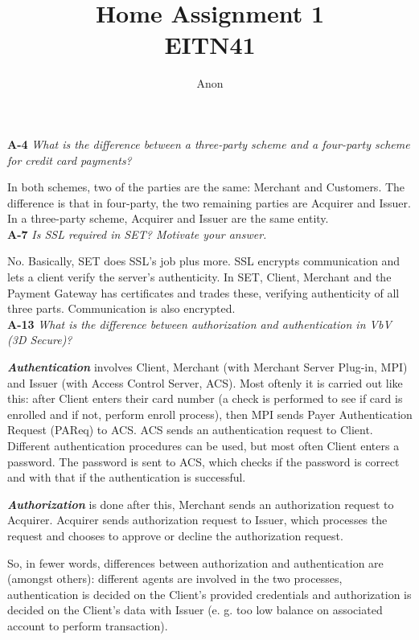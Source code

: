 \documentclass[a4paper]{article}
\title{Home Assignment 1 \\ EITN41}
\author{Anon}
\date{}
\newcommand{\Q}[2]{
  \textbf{#1} \textit{#2}
 }
\newcommand{\A}[1]{ #1 \\ }
\begin{document}
\maketitle

\Q{A-4} {What  is  the  difference  between  a  three-party  scheme  and  a  four-party  
scheme  for  credit  card  payments?}

\A{
  In both schemes, two of the parties are the same: Merchant and Customers.
  The difference is that in four-party, the two remaining parties are
  Acquirer and Issuer. In a three-party scheme, 
  Acquirer and Issuer are the same entity.
}

\Q{A-7} {Is SSL required in SET? Motivate your answer.}

\A{
  No. Basically, SET does SSL's job plus more. SSL encrypts communication and lets 
  a client verify the server's authenticity. In SET, Client, Merchant and 
  the Payment Gateway has certificates and trades these, verifying authenticity
  of all three parts. Communication is also encrypted.
}

\Q{A-13} {What is the difference between \textup{authorization} and 
\textup{authentication} in VbV (3D Secure)?}

\A{
  \textbf{\textit{Authentication}} involves Client, Merchant (with Merchant Server Plug-in, MPI)
  and Issuer (with Access Control Server, ACS). 
  Most oftenly it is carried out like this:
  after Client enters their card number (a check is performed to see if card
  is enrolled and if not, perform enroll process), then MPI sends
  Payer Authentication Request (PAReq) to ACS. ACS sends an authentication
  request to Client. Different authentication procedures can be used,
  but most often Client enters a password. The password is sent to ACS,
  which checks if the password is correct and with that if the authentication
  is successful. 

  \textbf{\textit{Authorization}} is done after this, Merchant sends
  an authorization request to Acquirer. Acquirer sends authorization 
  request to Issuer, which processes the request and chooses to approve
  or decline the authorization request.

  So, in fewer words, differences between authorization and authentication
  are (amongst others): 
  different agents are involved in the two processes,  
  authentication is decided on the Client's provided credentials
  and authorization is decided on the Client's data with Issuer
  (e. g. too low balance on associated account to perform transaction).
}
\end{document}

